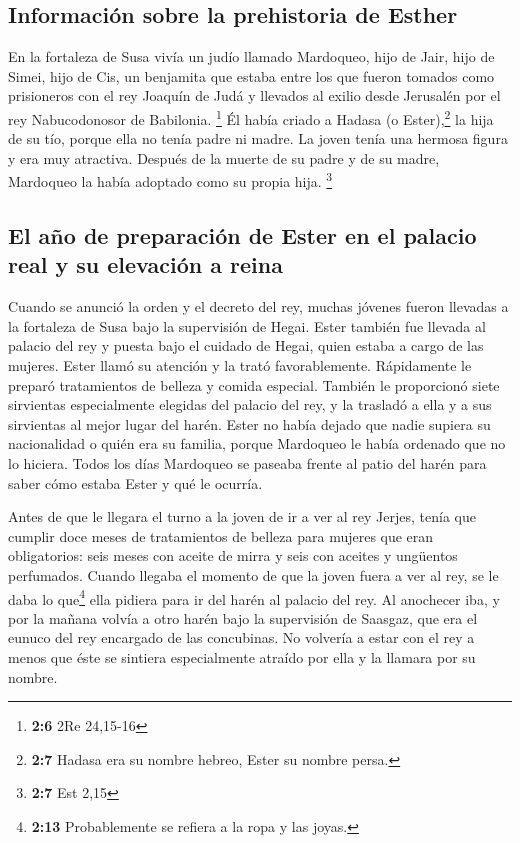 \hypertarget{informaciuxf3n-sobre-la-prehistoria-de-esther}{%
\subsection{Información sobre la prehistoria de
Esther}\label{informaciuxf3n-sobre-la-prehistoria-de-esther}}

 En la fortaleza de Susa vivía un judío llamado Mardoqueo,
hijo de Jair, hijo de Simei, hijo de Cis, un benjamita 
que estaba entre los que fueron tomados como prisioneros con el rey
Joaquín de Judá y llevados al exilio desde Jerusalén por el rey
Nabucodonosor de Babilonia. \footnote{\textbf{2:6} 2Re 24,15-16}
 Él había criado a Hadasa (o Ester),\footnote{\textbf{2:7}
  Hadasa era su nombre hebreo, Ester su nombre persa.} la hija de su
tío, porque ella no tenía padre ni madre. La joven tenía una hermosa
figura y era muy atractiva. Después de la muerte de su padre y de su
madre, Mardoqueo la había adoptado como su propia hija. \footnote{\textbf{2:7}
  Est 2,15}

\hypertarget{el-auxf1o-de-preparaciuxf3n-de-ester-en-el-palacio-real-y-su-elevaciuxf3n-a-reina}{%
\subsection{El año de preparación de Ester en el palacio real y su
elevación a
reina}\label{el-auxf1o-de-preparaciuxf3n-de-ester-en-el-palacio-real-y-su-elevaciuxf3n-a-reina}}

 Cuando se anunció la orden y el decreto del rey, muchas
jóvenes fueron llevadas a la fortaleza de Susa bajo la supervisión de
Hegai. Ester también fue llevada al palacio del rey y puesta bajo el
cuidado de Hegai, quien estaba a cargo de las mujeres. 
Ester llamó su atención y la trató favorablemente. Rápidamente le
preparó tratamientos de belleza y comida especial. También le
proporcionó siete sirvientas especialmente elegidas del palacio del rey,
y la trasladó a ella y a sus sirvientas al mejor lugar del harén.
 Ester no había dejado que nadie supiera su nacionalidad
o quién era su familia, porque Mardoqueo le había ordenado que no lo
hiciera.  Todos los días Mardoqueo se paseaba frente al
patio del harén para saber cómo estaba Ester y qué le ocurría.

 Antes de que le llegara el turno a la joven de ir a ver
al rey Jerjes, tenía que cumplir doce meses de tratamientos de belleza
para mujeres que eran obligatorios: seis meses con aceite de mirra y
seis con aceites y ungüentos perfumados.  Cuando llegaba
el momento de que la joven fuera a ver al rey, se le daba lo
que\footnote{\textbf{2:13} Probablemente se refiera a la ropa y las
  joyas.} ella pidiera para ir del harén al palacio del rey.
 Al anochecer iba, y por la mañana volvía a otro harén
bajo la supervisión de Saasgaz, que era el eunuco del rey encargado de
las concubinas. No volvería a estar con el rey a menos que éste se
sintiera especialmente atraído por ella y la llamara por su nombre.

